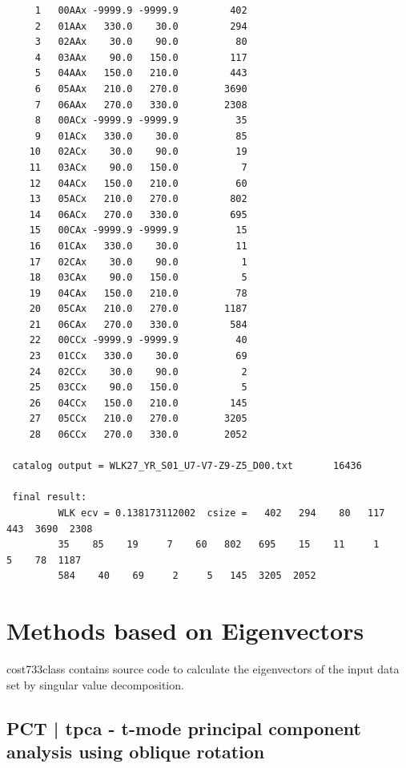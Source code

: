 \documentclass[12pt, oneside, a4paper, headsepline, plainheadsepline]{scrbook}
\begin{document}
\begin{scriptsize}
\begin{lstlisting}
     1   00AAx -9999.9 -9999.9         402
     2   01AAx   330.0    30.0         294
     3   02AAx    30.0    90.0          80
     4   03AAx    90.0   150.0         117
     5   04AAx   150.0   210.0         443
     6   05AAx   210.0   270.0        3690
     7   06AAx   270.0   330.0        2308
     8   00ACx -9999.9 -9999.9          35
     9   01ACx   330.0    30.0          85
    10   02ACx    30.0    90.0          19
    11   03ACx    90.0   150.0           7
    12   04ACx   150.0   210.0          60
    13   05ACx   210.0   270.0         802
    14   06ACx   270.0   330.0         695
    15   00CAx -9999.9 -9999.9          15
    16   01CAx   330.0    30.0          11
    17   02CAx    30.0    90.0           1
    18   03CAx    90.0   150.0           5
    19   04CAx   150.0   210.0          78
    20   05CAx   210.0   270.0        1187
    21   06CAx   270.0   330.0         584
    22   00CCx -9999.9 -9999.9          40
    23   01CCx   330.0    30.0          69
    24   02CCx    30.0    90.0           2
    25   03CCx    90.0   150.0           5
    26   04CCx   150.0   210.0         145
    27   05CCx   210.0   270.0        3205
    28   06CCx   270.0   330.0        2052
 
 catalog output = WLK27_YR_S01_U7-V7-Z9-Z5_D00.txt       16436

 final result:
         WLK ecv = 0.138173112002  csize =   402   294    80   117   443  3690  2308    
         35    85    19     7    60   802   695    15    11     1     5    78  1187  
         584    40    69     2     5   145  3205  2052
\end{lstlisting}
\end{scriptsize}

\section{Methods based on Eigenvectors}

cost733class contains source code to calculate the eigenvectors of the input data set by singular value 
decomposition.

\subsection{PCT | tpca - t-mode principal component analysis using oblique rotation}
\end{document}
